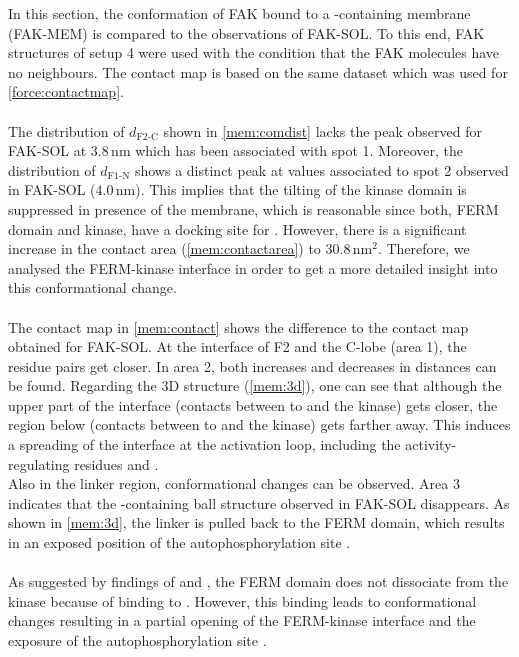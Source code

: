 \label{membrane:chapter}
In this section, the conformation of FAK bound to a \pip{}-containing membrane (FAK-MEM) is compared to the observations of FAK-SOL. To this end, FAK structures of setup 4 were used with the condition that the FAK molecules have no neighbours. The contact map is based on the same dataset which was used for \autoref{force:contactmap}.\\
\\
The distribution of $d_\text{F2-C}$ shown in \autoref{mem:comdist} lacks the peak observed for FAK-SOL at $3.8\,\si{\nano\metre}$ which has been associated with spot 1. Moreover, the distribution of $d_\text{F1-N}$ shows a distinct peak at values associated to spot 2 observed in FAK-SOL ($4.0\,\si{\nano\metre}$). This implies that the tilting of the kinase domain is suppressed in presence of the membrane, which is reasonable since both, FERM domain and kinase, have a docking site for \pip{}. However, there is a significant increase in the contact area (\autoref{mem:contactarea}) to $30.8\,\si{\nano\metre}^2$. Therefore, we analysed the FERM-kinase interface in order to get a more detailed insight into this conformational change.\\
\\
The contact map in \autoref{mem:contact} shows the difference to the contact map obtained for FAK-SOL. At the interface of F2 and the C-lobe (area 1), the residue pairs get closer. In area 2, both increases and decreases in distances can be found. Regarding the 3D structure (\autoref{mem:3d}), one can see that although the upper part of the interface (contacts between  to  and the kinase) gets closer, the region below (contacts between  to  and the kinase) gets farther away. This induces a spreading of the interface at the activation loop, including the activity-regulating residues  and .\\
Also in the linker region, conformational changes can be observed. Area 3 indicates that the -containing ball structure observed in FAK-SOL disappears. As shown in \autoref{mem:3d}, the linker is pulled back to the FERM domain, which results in an exposed position of the autophosphorylation site .\\
\\
As suggested by findings of \textcite{pap001} and \textcite{pap003}, the FERM domain does not dissociate from the kinase because of binding to \pip{}. However, this binding leads to conformational changes resulting in a partial opening of the FERM-kinase interface and the exposure of the autophosphorylation site .
